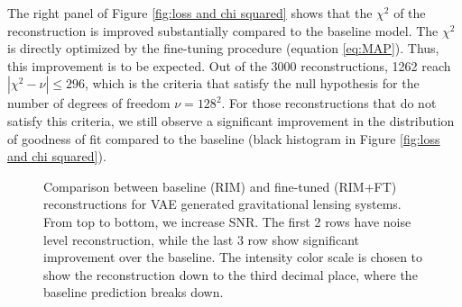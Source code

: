 The right panel of Figure \ref{fig:loss and chi squared} shows that 
the $\chi^2$ of the reconstruction is improved substantially compared to the 
baseline model. The $\chi^2$ is directly optimized by the fine-tuning procedure 
(equation \eqref{eq:MAP}). Thus, this improvement is to be expected. 
Out of the 
3000 reconstructions, 1262 reach $|\chi^2 - \nu| \leq 296$, which is the criteria 
that satisfy the null hypothesis for the number of degrees of freedom 
$\nu=128^{2}$. For those reconstructions that do not satisfy this criteria, 
we still observe a significant improvement in the distribution of goodness of fit 
compared to the baseline (black histogram in Figure \ref{fig:loss and chi squared}).


\begin{figure}[t!]
        \centering
        \caption{
        Comparison between baseline (RIM) and fine-tuned (RIM+FT) reconstructions for VAE generated 
        gravitational lensing systems. 
        From top to bottom, we increase SNR. The first 2 
        rows have noise level reconstruction, while the last 3 row show significant improvement 
        over the baseline. The intensity color scale is chosen to show the reconstruction
down to the third decimal place, where the baseline prediction breaks down.}
        \label{fig:increasing SNR}
\end{figure}

